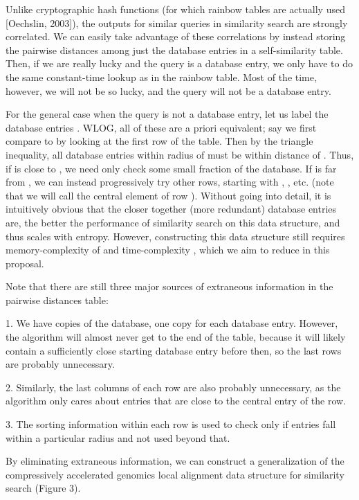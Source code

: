 \documentclass{amsbook}
\theoremstyle{definition}
\theoremstyle{remark}
\numberwithin{equation}{section}
\begin{document}
Unlike cryptographic hash functions (for which rainbow tables are actually used [Oechslin, 2003]), the outputs for similar queries in similarity search are strongly correlated.
We can easily take advantage of these correlations by instead storing the pairwise distances among just the database entries in a self-similarity table.
Then, if we are really lucky and the query is a database entry, we only have to do the same constant-time lookup as in the rainbow table.
Most of the time, however, we will not be so lucky, and the query will not be a database entry.


For the general case when the query is not a database entry, let us label the database entries .
WLOG, all of these are a priori equivalent; say we first compare  to  by looking at the first row of the table.
Then by the triangle inequality, all database entries within radius  of  must be within distance  of .
Thus, if  is close to , we need only check some small fraction of the database.
If  is far from , we can instead progressively try other rows, starting with , , etc.
(note that we will call  the central element of row ).
Without going into detail, it is intuitively obvious that the closer together (more redundant) database entries are, the better the performance of similarity search on this data structure, and thus scales with entropy.
However, constructing this data structure still requires memory-complexity of  and time-complexity , which we aim to reduce in this proposal.

Note that there are still three major sources of extraneous information in the pairwise distances table:

1.
We have  copies of the database, one copy for each database entry.
However, the algorithm will almost never get to the end of the table, because it will likely contain a sufficiently close starting database entry before then, so the last rows are probably unnecessary.

2.
Similarly, the last columns of each row are also probably unnecessary, as the algorithm only cares about entries that are close to the central entry of the row.

3.
The sorting information within each row is used to check only if entries fall within a particular radius and not used beyond that.

By eliminating extraneous information, we can construct a generalization of the compressively accelerated genomics local alignment data structure for similarity search (Figure 3).
\end{document}
